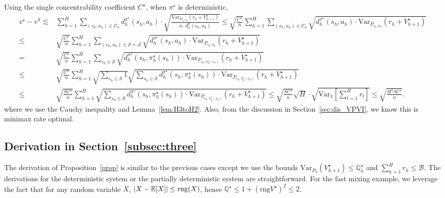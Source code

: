 Using the single concentrability coefficient $C^\star$, when $\pi^\star$ is deterministic,
{\small
\begin{align*}
v^\star-v^{\widehat{\pi}}\lesssim&\sum_{h=1}^H\sum_{(s_h,a_h)\in\mathcal{C}_h}d^{\pi^\star}_h(s_h,a_h)\cdot\sqrt{\frac{\mathrm{Var}_{P_{s_h,a_h}}(r_h+V^\star_{h+1})}{ n\cdot d^\mu_h{(s_h,a_h)}}}
\leq \sqrt{\frac{C^\star}{n }}\sum_{h=1}^H\sum_{(s_h,a_h)\in\mathcal{C}_h}\sqrt{{d^{\pi^\star}_h(s_h,a_h)\cdot \mathrm{Var}_{P_{s_h,a_h}}(r_h+V^\star_{h+1})}}\\
\leq &\sqrt{\frac{C^\star}{n }}\sum_{h=1}^H\sum_{(s_h,a_h)\in\mathcal{S}\times\mathcal{A}}\sqrt{{d^{\pi^\star}_h(s_h,a_h)\cdot \mathrm{Var}_{P_{s_h,a_h}}(r_h+V^\star_{h+1})}}\\
=&\sqrt{\frac{C^\star}{n }}\sum_{h=1}^H\sum_{s_h\in\mathcal{S}}\sqrt{{d^{\pi^\star}_h(s_h,\pi^\star_h(s_h))\cdot \mathrm{Var}_{P_{s_h,\pi^\star_h(s_h)}}(r_h+V^\star_{h+1})}}\\
\leq & \sqrt{\frac{C^\star}{n }}\sum_{h=1}^H\sqrt{\sum_{s_h\in\mathcal{S}}1}\sqrt{{\sum_{s_h\in\mathcal{S}}d^{\pi^\star}_h(s_h,\pi^\star_h(s_h))\cdot \mathrm{Var}_{P_{s_h,\pi^\star_h(s_h)}}(r_h+V^\star_{h+1})}}\\
\leq & \sqrt{\frac{SC^\star}{n }}\sum_{h=1}^H\sqrt{{\sum_{s_h\in\mathcal{S}}d^{\pi^\star}_h(s_h,\pi^\star_h(s_h))\cdot \mathrm{Var}_{P_{s_h,\pi^\star_h(s_h)}}(r_h+V^\star_{h+1})}}
\leq \sqrt{\frac{SC^\star}{n }} \sqrt{H}\cdot\sqrt{\mathrm{Var}_{\pi}\left[\sum_{t=1}^{H} r_{t}\right]}\leq \sqrt{\frac{H^3SC^\star}{n }}.
\end{align*}}
where we use the Cauchy inequality and Lemma~\ref{lem:H3toH2}. Also, from the discussion in Section~\ref{sec:dis_VPVI}, we know this is minimax rate optimal.

\subsection{Derivation in Section~\ref{subsec:three}}

The derivation of Proposition~\ref{prop} is similar to the previous cases except we use the bounds $\mathrm{Var}_{P_h}(V^\star_{h+1})\leq \mathbb{Q}^\star_h$ and $\sum_{h=1}^H r_h\leq \mathcal{B}$. The derivations for the deterministic system or the partially deterministic system are straightforward. For the fast mixing example, we leverage the fact that for any random variable $X$, $|X-\mathbb{E}[X]|\leq \mathrm{rng}(X)$, hence $\mathbb{Q}^\star\leq 1+(\mathrm{rng}V^\star)^2\leq 2$. 

